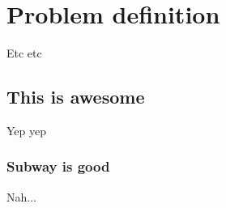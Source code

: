 \chapter{Problem definition}
Etc etc

\section{This is awesome}
Yep yep

\subsection{Subway is good}
Nah...